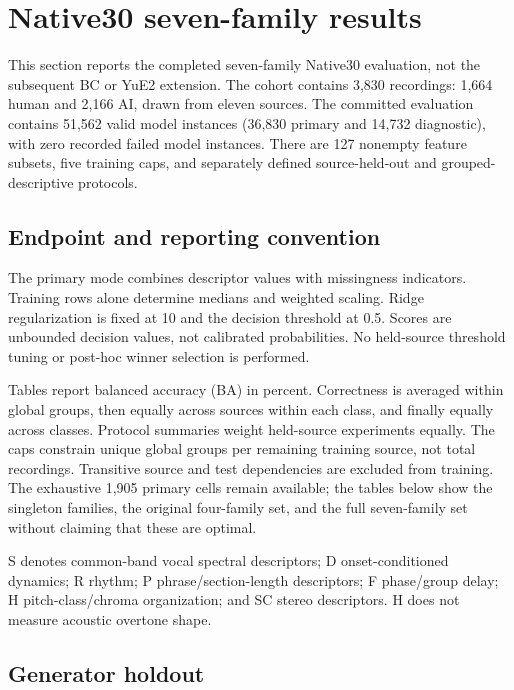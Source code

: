 \section{Native30 seven-family results}

\label{sec:native30-seven}

This section reports the completed seven-family Native30 evaluation, not the subsequent BC or YuE2 extension. The cohort contains 3,830 recordings: 1,664 human and 2,166 AI, drawn from eleven sources. The committed evaluation contains 51,562 valid model instances (36,830 primary and 14,732 diagnostic), with zero recorded failed model instances. There are 127 nonempty feature subsets, five training caps, and separately defined source-held-out and grouped-descriptive protocols.

\subsection{Endpoint and reporting convention}

The primary mode combines descriptor values with missingness indicators. Training rows alone determine medians and weighted scaling. Ridge regularization is fixed at 10 and the decision threshold at 0.5. Scores are unbounded decision values, not calibrated probabilities. No held-source threshold tuning or post-hoc winner selection is performed.

Tables report balanced accuracy (BA) in percent. Correctness is averaged within global groups, then equally across sources within each class, and finally equally across classes. Protocol summaries weight held-source experiments equally. The caps constrain unique global groups per remaining training source, not total recordings. Transitive source and test dependencies are excluded from training. The exhaustive 1,905 primary cells remain available; the tables below show the singleton families, the original four-family set, and the full seven-family set without claiming that these are optimal.

S denotes common-band vocal spectral descriptors; D onset-conditioned dynamics; R rhythm; P phrase/section-length descriptors; F phase/group delay; H pitch-class/chroma organization; and SC stereo descriptors. H does not measure acoustic overtone shape.

\subsection{Generator holdout}


